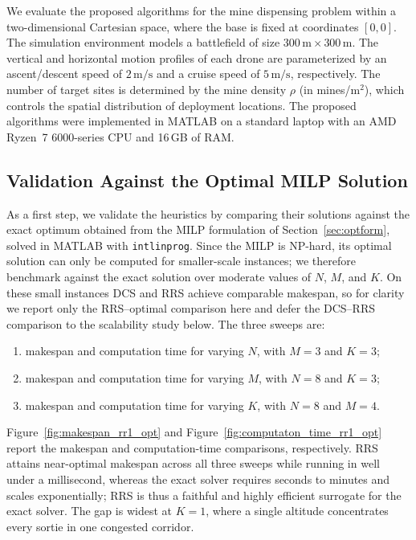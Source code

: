 \documentclass[subscriptcorrection,upint,nolists, varvw,barcolor=Goldenrod3,mathalfa=cal=euler,balance,hyphenate,french]{asmejour} %
\begin{document}
We evaluate the proposed algorithms for the mine dispensing problem within a two-dimensional Cartesian space, where the base is fixed at coordinates \([0, 0]\). 
The simulation environment models a battlefield of size \(300\,\text{m} \times 300\,\text{m}\).
The vertical and horizontal motion profiles of each drone are parameterized by an ascent/descent speed of \(2\,\text{m/s}\) and a cruise speed of \(5\,\text{m/s}\), respectively. The number of target sites is determined by the mine density \(\rho\) (in mines/m\(^2\)), which controls the spatial distribution of deployment locations. 
The proposed algorithms were implemented in MATLAB on a standard laptop with an AMD Ryzen~7 6000-series CPU and 16\,GB of RAM.

\subsection{Validation Against the Optimal MILP Solution}
As a first step, we validate the heuristics by comparing their solutions against the exact optimum obtained from the MILP formulation of Section~\ref{sec:optform}, solved in MATLAB with \texttt{intlinprog}.
Since the MILP is NP-hard, its optimal solution can only be computed for smaller-scale instances; we therefore benchmark against the exact solution over moderate values of \(N\), \(M\), and \(K\). On these small instances DCS and RRS achieve comparable makespan, so for clarity we report only the RRS--optimal comparison here and defer the DCS--RRS comparison to the scalability study below. The three sweeps are:


\begin{enumerate}
    \item makespan and computation time for varying \(N\), with \(M=3\) and \(K=3\);
    \item makespan and computation time for varying \(M\), with \(N=8\) and \(K=3\);
    \item makespan and computation time for varying \(K\), with \(N=8\) and \(M=4\).
\end{enumerate}


Figure~\ref{fig:makespan_rr1_opt} and Figure~\ref{fig:computaton_time_rr1_opt} report the makespan and computation-time comparisons, respectively.
RRS attains near-optimal makespan across all three sweeps while running in well under a millisecond, whereas the exact solver requires seconds to minutes and scales exponentially; RRS is thus a faithful and highly efficient surrogate for the exact solver. The gap is widest at \(K=1\), where a single altitude concentrates every sortie in one congested corridor.
\end{document}
